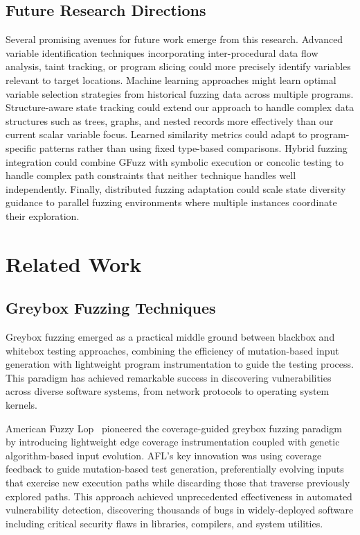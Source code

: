 \documentclass[review]{elsarticle}
\begin{document}
\subsection{Future Research Directions}

Several promising avenues for future work emerge from this research. Advanced variable identification techniques incorporating inter-procedural data flow analysis, taint tracking, or program slicing could more precisely identify variables relevant to target locations. Machine learning approaches might learn optimal variable selection strategies from historical fuzzing data across multiple programs. Structure-aware state tracking could extend our approach to handle complex data structures such as trees, graphs, and nested records more effectively than our current scalar variable focus. Learned similarity metrics could adapt to program-specific patterns rather than using fixed type-based comparisons. Hybrid fuzzing integration could combine GFuzz with symbolic execution or concolic testing to handle complex path constraints that neither technique handles well independently. Finally, distributed fuzzing adaptation could scale state diversity guidance to parallel fuzzing environments where multiple instances coordinate their exploration.

\section{Related Work}
\label{sec:related}

\subsection{Greybox Fuzzing Techniques}

Greybox fuzzing emerged as a practical middle ground between blackbox and whitebox testing approaches, combining the efficiency of mutation-based input generation with lightweight program instrumentation to guide the testing process. This paradigm has achieved remarkable success in discovering vulnerabilities across diverse software systems, from network protocols to operating system kernels.

American Fuzzy Lop~\cite{afl} pioneered the coverage-guided greybox fuzzing paradigm by introducing lightweight edge coverage instrumentation coupled with genetic algorithm-based input evolution. AFL's key innovation was using coverage feedback to guide mutation-based test generation, preferentially evolving inputs that exercise new execution paths while discarding those that traverse previously explored paths. This approach achieved unprecedented effectiveness in automated vulnerability detection, discovering thousands of bugs in widely-deployed software including critical security flaws in libraries, compilers, and system utilities.
\end{document}

